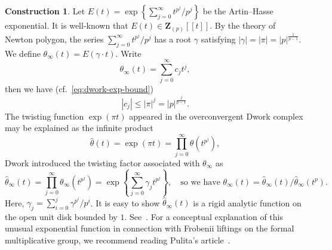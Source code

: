 \documentclass{amsart}
\numberwithin{equation}{section}
\theoremstyle{plain}
\theoremstyle{definition}
\newtheorem{construction}[equation]{Construction}
\renewcommand{\mathbb}{\mathbf}
\begin{document}
\begin{construction}
Let \(E(t) = \exp\left\{ \sum_{j=0}^{\infty} t^{p^{j}}/p^{j} \right\}\)
be the Artin--Hasse exponential.
It is well-known that \(E(t) \in \mathbb{Z}_{(p)}[\![t]\!]\).
By the theory of Newton polygon, the series \(\sum_{j=0}^{\infty}t^{p^{j}}/p^{j}\)
has a root \(\gamma\) satisfying \(|\gamma| = |\pi| = |p|^{\frac{1}{p-1}}\).
We define \(\theta_{\infty}(t) = E(\gamma\cdot t)\).  Write
\begin{equation*}
\theta_{\infty}(t) = \sum_{j=0}^{\infty} c_{j}t^{j},
\end{equation*}
then we have (cf.~\eqref{eq:dwork-exp-bound})
\begin{equation}\label{eq:inf-level-bound}
|c_{j}| \leq |\pi|^{j} = |p|^{\frac{j}{p-1}}.
\end{equation}
The twisting function \(\exp(\pi t)\) appeared in the overconvergent
Dwork complex may be explained as the infinite product
\begin{equation*}
\widehat{\theta}(t) = \exp(\pi t) = \prod_{j=0}^{\infty} \theta(t^{p^{j}}),
\end{equation*}
Dwork introduced the twisting factor associated with
\(\theta_{\infty}\) as
\begin{equation*}
\widehat{\theta}_{\infty}(t) = \prod_{j=0}^{\infty} \theta_{\infty}(t^{p^{j}})
= \exp\left\{ \sum_{j=0}^{\infty} \gamma_{j} t^{p^{j}} \right\},\quad
\text{so we have }\theta_{\infty}(t) = \widehat{\theta}_{\infty}(t)/\widehat{\theta}_{\infty}(t^{p}).
\end{equation*}
Here, \(\gamma_{j}=\sum_{i=0}^{j}\gamma^{p^{i}}/p^{i}\).  It is easy
to show \(\widehat{\theta}_{\infty}(t)\) is a rigid analytic function
on the open unit disk bounded by \(1\).
See~\cite[Eq.~(4.13)]{dwork:zeta-function-hypersurface-1}.  For a
conceptual explanation of this unusual exponential function in
connection with Frobenii liftings on the formal multiplicative group,
we recommend reading Pulita's
article~\cite{pulita:rank-one-solvable-p-adic-differential-equations}.
\end{construction}
\end{document}
